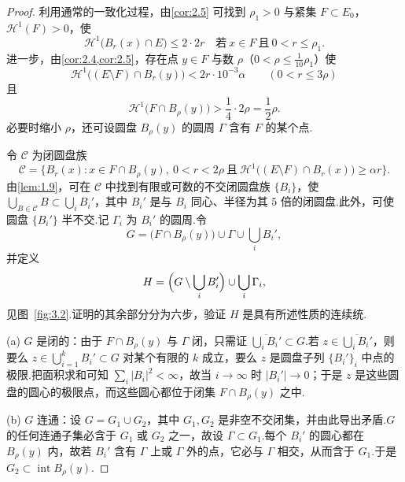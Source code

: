 \begin{proof}
利用通常的一致化过程，由\cref{cor:2.5} 可找到 $\rho_1>0$ 与紧集 $F\subset E_0$，$\mathcal{H}^1(F)>0$，使
\begin{equation}\label{eq:3.11}
  \mathcal{H}^{1}\bigl(B_r(x)\cap E\bigr)\leq 2\cdot 2r
  \quad\text{若}\ x\in F\ \text{且}\ 0<r\leq\rho_1.
\end{equation}
进一步，由\cref{cor:2.4,cor:2.5}，存在点 $y\in F$ 与数 $\rho$（$0<\rho\leq\frac{1}{10}\rho_1$）使
\begin{equation}\label{eq:3.12}
  \mathcal{H}^{1}\bigl((E\setminus F)\cap B_r(y)\bigr)<2r\cdot 10^{-3}\alpha\qquad(0<r\leq 3\rho)
\end{equation}
且
\begin{equation}\label{eq:3.13}
  \mathcal{H}^{1}\bigl(F\cap B_\rho(y)\bigr)>\frac{1}{4}\cdot 2\rho=\frac{1}{2}\rho.
\end{equation}
必要时缩小 $\rho$，还可设圆盘 $B_\rho(y)$ 的圆周 $\Gamma$ 含有 $F$ 的某个点.

令 $\mathcal{C}$ 为闭圆盘族
\begin{equation}\label{eq:3.14}
  \mathcal{C}=\bigl\{B_r(x):x\in F\cap B_\rho(y),\ 0<r<2\rho
  \ \text{且}\ \mathcal{H}^{1}\bigl((E\setminus F)\cap B_r(x)\bigr)\geq\alpha r\bigr\}.
\end{equation}
由\cref{lem:1.9}，可在 $\mathcal{C}$ 中找到有限或可数的不交闭圆盘族 $\{B_i\}$，使 $\bigcup_{B\in\mathcal{C}}B\subset\bigcup_i B_i'$，其中 $B_i'$ 是与 $B_i$ 同心、半径为其 $5$ 倍的闭圆盘.此外，可使圆盘 $\{B_i'\}$ 半不交.记 $\Gamma_i$ 为 $B_i'$ 的圆周.令
\[
  G=\bigl(F\cap B_\rho(y)\bigr)\cup\Gamma\cup\bigcup_{i}B_i',
\]
并定义
\begin{equation}\label{eq:3.15}
  H=\Bigl(G\setminus\bigcup_{i}B_i'\Bigr)\cup\bigcup_{i}\Gamma_i,
\end{equation}
见图~\ref{fig:3.2}.证明的其余部分分为六步，验证 $H$ 是具有所述性质的连续统.

(a) $G$ 是闭的：由于 $F\cap B_\rho(y)$ 与 $\Gamma$ 闭，只需证 $\overline{\bigcup_{i}B_i'}\subset G$.若 $z\in\overline{\bigcup_{i}B_i'}$，则要么 $z\in\bigcup_{i=1}^{k}B_i'\subset G$ 对某个有限的 $k$ 成立，要么 $z$ 是圆盘子列 $\{B_i'\}_i$ 中点的极限.把面积求和可知 $\sum_i|B_i|^2<\infty$，故当 $i\to\infty$ 时 $|B_i'|\to 0$；于是 $z$ 是这些圆盘的圆心的极限点，而这些圆心都位于闭集 $F\cap B_\rho(y)$ 之中.

(b) $G$ 连通：设 $G=G_1\cup G_2$，其中 $G_1,G_2$ 是非空不交闭集，并由此导出矛盾.$G$ 的任何连通子集必含于 $G_1$ 或 $G_2$ 之一，故设 $\Gamma\subset G_1$.每个 $B_i'$ 的圆心都在 $B_\rho(y)$ 内，故若 $B_i'$ 含有 $\Gamma$ 上或 $\Gamma$ 外的点，它必与 $\Gamma$ 相交，从而含于 $G_1$.于是 $G_2\subset\operatorname{int}B_\rho(y)$.


\end{proof}
